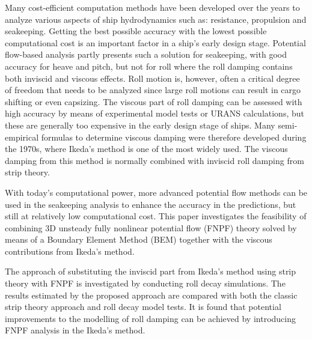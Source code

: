 Many cost-efficient computation methods have been developed over the years to analyze various aspects of ship hydrodynamics such as: resistance, propulsion and seakeeping. Getting the best possible accuracy with the lowest possible computational cost is an important factor in a ship’s early design stage. Potential flow-based analysis partly presents such a solution for seakeeping, with good accuracy for heave and pitch, but not for roll where the roll damping contains both inviscid and viscous effects. Roll motion is, however, often a critical degree of freedom that needs to be analyzed since large roll motions can result in cargo shifting or even capsizing. 
The viscous part of roll damping can be assessed with high accuracy by means of experimental model tests or URANS calculations, but these are generally too expensive in the early design stage of ships. Many semi-empirical formulas to determine viscous damping were therefore developed during the 1970s, where Ikeda’s method is one of the most widely used.
The viscous damping from this method is normally combined with inviscid roll damping from strip theory.

With today’s computational power, more advanced potential flow methods can be used in the seakeeping analysis to enhance the accuracy in the predictions, but still at relatively low computational cost. This paper investigates the feasibility of combining 3D unsteady fully nonlinear potential flow (FNPF) theory solved by means of a Boundary Element Method (BEM) together with the viscous contributions from Ikeda’s method.

The approach of substituting the inviscid part from Ikeda’s method using strip theory with FNPF is investigated by conducting roll decay simulations. The results estimated by the proposed approach are compared with both the classic strip theory approach and roll decay model tests. It is found that potential improvements to the modelling of roll damping can be achieved by introducing FNPF analysis in the Ikeda’s method.

 



